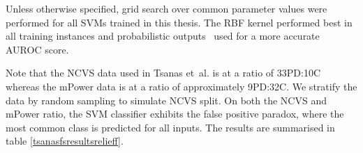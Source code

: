 \documentclass[12pt, twoside]{book}
\begin{document}
\begin{highlight}
	Unless otherwise specified, grid search over common parameter values were performed for all SVMs trained in this thesis. The RBF kernel performed best in all training instances and probabilistic outputs~\cite{svmprobabilistic} used for a more accurate AUROC score.
\end{highlight}

Note that the NCVS data used in Tsanas et~al. is at a ratio of 33PD:10C whereas the mPower data is at a ratio of approximately 9PD:32C. We stratify the data by random sampling to simulate NCVS split. On both the NCVS and mPower ratio, the SVM classifier exhibits the false positive paradox, where the most common class is predicted for all inputs. The results are summarised in table \ref{tsanasfsresultsrelieff}. 
\end{document}
